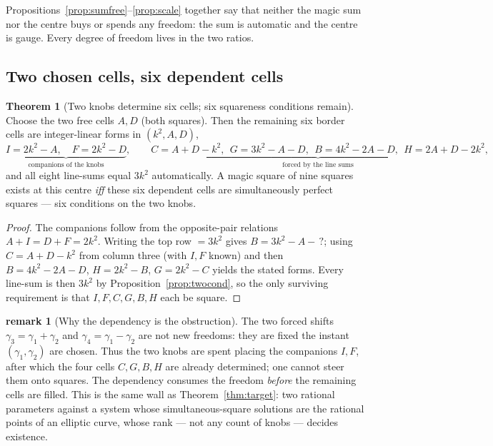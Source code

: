 \documentclass[11pt]{article}
\theoremstyle{definition}
\newtheorem{theorem}{Theorem}
\newtheorem{remark}{remark}
\begin{document}
\noindent Propositions~\ref{prop:sumfree}--\ref{prop:scale} together say that neither
the magic sum nor the centre buys or spends any freedom: the sum is automatic and the
centre is gauge. Every degree of freedom lives in the two ratios.

\subsection{Two chosen cells, six dependent cells}

\begin{theorem}[Two knobs determine six cells; six squareness conditions remain]
\label{thm:sixcond}
Choose the two free cells $A,D$ (both squares). Then the remaining six border cells
are integer-linear forms in $(k^{2},A,D)$,
\[
  \underbrace{I=2k^{2}-A,\quad F=2k^{2}-D}_{\text{companions of the knobs}},\qquad
  \underbrace{C=A+D-k^{2},\ \ G=3k^{2}-A-D,\ \ B=4k^{2}-2A-D,\ \ H=2A+D-2k^{2}}_{\text{forced by the line sums}},
\]
and all eight line-sums equal $3k^{2}$ automatically. A magic square of nine squares
exists at this centre \emph{iff} these six dependent cells are simultaneously perfect
squares --- six conditions on the two knobs.
\end{theorem}

\begin{proof}
The companions follow from the opposite-pair relations $A+I=D+F=2k^{2}$. Writing the
top row $=3k^{2}$ gives $B=3k^{2}-A-\,?$; using $C=A+D-k^{2}$ from column three
(with $I,F$ known) and then $B=4k^{2}-2A-D$, $H=2k^{2}-B$, $G=2k^{2}-C$ yields the
stated forms. Every line-sum is then $3k^{2}$ by Proposition~\ref{prop:twocond}, so the
only surviving requirement is that $I,F,C,G,B,H$ each be square.
\end{proof}

\begin{remark}[Why the dependency is the obstruction]
The two forced shifts $\gamma_3=\gamma_1+\gamma_2$ and $\gamma_4=\gamma_1-\gamma_2$
are not new freedoms: they are fixed the instant $(\gamma_1,\gamma_2)$ are chosen.
Thus the two knobs are spent placing the companions $I,F$, after which the four cells
$C,G,B,H$ are already determined; one cannot steer them onto squares. The dependency
consumes the freedom \emph{before} the remaining cells are filled. This is the same
wall as Theorem~\ref{thm:target}: two rational parameters against a system whose
simultaneous-square solutions are the rational points of an elliptic curve, whose rank
--- not any count of knobs --- decides existence.
\end{remark}
\end{document}
